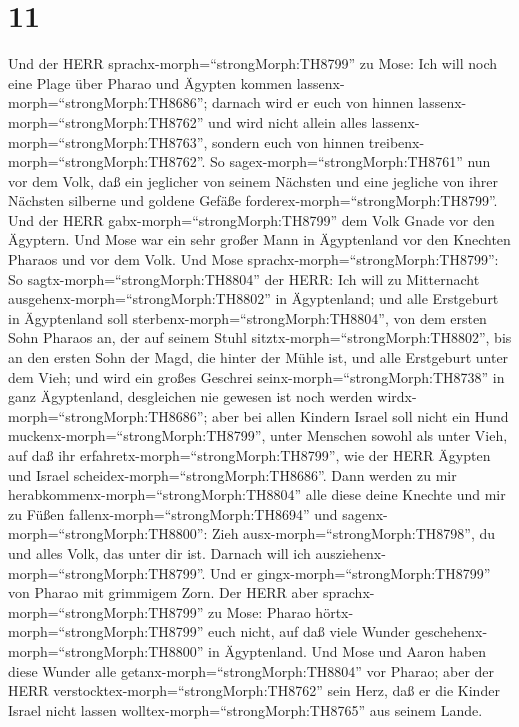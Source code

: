 \hypertarget{section-10}{%
\section{11}\label{section-10}}

 Und der HERR sprachx-morph=``strongMorph:TH8799'' zu Mose:
Ich will noch eine Plage über Pharao und Ägypten kommen
lassenx-morph=``strongMorph:TH8686''; darnach wird er euch von hinnen
lassenx-morph=``strongMorph:TH8762'' und wird nicht allein alles
lassenx-morph=``strongMorph:TH8763'', sondern euch von hinnen
treibenx-morph=``strongMorph:TH8762''.  So
sagex-morph=``strongMorph:TH8761'' nun vor dem Volk, daß ein jeglicher
von seinem Nächsten und eine jegliche von ihrer Nächsten silberne und
goldene Gefäße forderex-morph=``strongMorph:TH8799''.  Und
der HERR gabx-morph=``strongMorph:TH8799'' dem Volk Gnade vor den
Ägyptern. Und Mose war ein sehr großer Mann in Ägyptenland vor den
Knechten Pharaos und vor dem Volk.  Und Mose
sprachx-morph=``strongMorph:TH8799'': So
sagtx-morph=``strongMorph:TH8804'' der HERR: Ich will zu Mitternacht
ausgehenx-morph=``strongMorph:TH8802'' in Ägyptenland;  und
alle Erstgeburt in Ägyptenland soll
sterbenx-morph=``strongMorph:TH8804'', von dem ersten Sohn Pharaos an,
der auf seinem Stuhl sitztx-morph=``strongMorph:TH8802'', bis an den
ersten Sohn der Magd, die hinter der Mühle ist, und alle Erstgeburt
unter dem Vieh;  und wird ein großes Geschrei
seinx-morph=``strongMorph:TH8738'' in ganz Ägyptenland, desgleichen nie
gewesen ist noch werden wirdx-morph=``strongMorph:TH8686''; 
aber bei allen Kindern Israel soll nicht ein Hund
muckenx-morph=``strongMorph:TH8799'', unter Menschen sowohl als unter
Vieh, auf daß ihr erfahretx-morph=``strongMorph:TH8799'', wie der HERR
Ägypten und Israel scheidex-morph=``strongMorph:TH8686''. 
Dann werden zu mir herabkommenx-morph=``strongMorph:TH8804'' alle diese
deine Knechte und mir zu Füßen fallenx-morph=``strongMorph:TH8694'' und
sagenx-morph=``strongMorph:TH8800'': Zieh
ausx-morph=``strongMorph:TH8798'', du und alles Volk, das unter dir ist.
Darnach will ich ausziehenx-morph=``strongMorph:TH8799''. Und er
gingx-morph=``strongMorph:TH8799'' von Pharao mit grimmigem Zorn.
 Der HERR aber sprachx-morph=``strongMorph:TH8799'' zu Mose:
Pharao hörtx-morph=``strongMorph:TH8799'' euch nicht, auf daß viele
Wunder geschehenx-morph=``strongMorph:TH8800'' in Ägyptenland.
 Und Mose und Aaron haben diese Wunder alle
getanx-morph=``strongMorph:TH8804'' vor Pharao; aber der HERR
verstocktex-morph=``strongMorph:TH8762'' sein Herz, daß er die Kinder
Israel nicht lassen wolltex-morph=``strongMorph:TH8765'' aus seinem
Lande.

